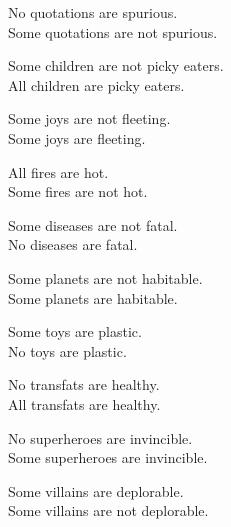 \begin{exercises}

\item No quotations are spurious.  \\
	Some quotations are not spurious.  

\item Some children are not picky eaters.  \\
	All children are picky eaters. \answer{\\Contradictories}

\item Some joys are not fleeting.  \\
	Some joys are fleeting.  \answer{\\Subcontraries}

\item All fires are hot.  \\
	Some fires are not hot.  \answer{\\Contradictories}

\item Some diseases are not fatal.  \\
	No diseases are fatal.  

\item Some planets are not habitable.  \\
	Some planets are habitable. \answer{\\Subcontraries}

\item Some toys are plastic.  \\
	No toys are plastic.   \answer{\\Contradictories}

\item No transfats are healthy.  \\
	All transfats are healthy.  \answer{\\Contraries}

\item No superheroes are invincible.   \\
	Some superheroes are invincible. \answer{\\Contradictories}

\item Some villains are deplorable.  \\ 
	Some villains are not deplorable.  \answer{\\Subcontraries}

\end{exercises}

